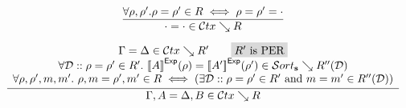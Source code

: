 \[
\begin{array}{c}
  \infer{
    \ctxempty = \ctxempty \in \perctx \searrow R
  }{
    \forall \rho, \rho'. \rho = \rho' \in R \iff \rho = \rho' = \denvempty
  }
  \\[8pt]
  \infer{
    \ctxext \Gamma A = \ctxext \Delta B \in \perctx \searrow R
  }{
    \begin{array}{c}
      \Gamma = \Delta \in \perctx \searrow R'
      \qquad
      \mhighlight{R' \text{ is PER}}
      \\
      \forall \DD :: \rho = \rho' \in R'.\ \evalexpfunc A \rho = \evalexpfunc {A'} {\rho'} \in \persort \searrow R''(\DD)
      \\
      \forall \rho, \rho', m, m'.\ \denvext \rho m = \denvext {\rho'} {m'} \in R \iff (\exists \DD :: \rho = \rho' \in R' ~ \text{and} ~ m = m' \in R''(\DD))
    \end{array}
  }
\end{array}
\]

